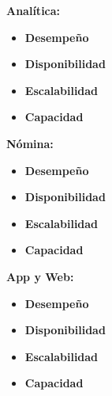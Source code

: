 \documentclass[a4paper]{article}
\begin{document}
\textbf{Analítica:}
\begin{itemize}
    \item \textbf{Desempeño}
    \item \textbf{Disponibilidad}
    \item \textbf{Escalabilidad}
    \item \textbf{Capacidad}
\end{itemize}

\textbf{Nómina:}
\begin{itemize}
    \item \textbf{Desempeño}
    \item \textbf{Disponibilidad}
    \item \textbf{Escalabilidad}
    \item \textbf{Capacidad}
\end{itemize}

\textbf{App y Web:}
\begin{itemize}
    \item \textbf{Desempeño}
    \item \textbf{Disponibilidad}
    \item \textbf{Escalabilidad}
    \item \textbf{Capacidad}
\end{itemize}
\end{document}
